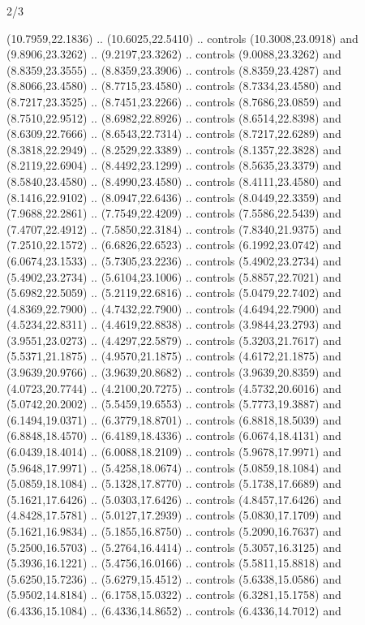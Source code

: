 \begin{flagdescription}{2/3}
\begin{scope}[yshift=\flagwidth,scale=\flagwidth/1241.93737]
\begin{scope}[y=-1mm, x=1mm,draw=gold,fill=blue,line join=miter,miter limit=4,line width=1.8\lw]
{  (10.7959,22.1836) .. (10.6025,22.5410) .. controls (10.3008,23.0918) and
  (9.8906,23.3262) .. (9.2197,23.3262) .. controls (9.0088,23.3262) and
  (8.8359,23.3555) .. (8.8359,23.3906) .. controls (8.8359,23.4287) and
  (8.8066,23.4580) .. (8.7715,23.4580) .. controls (8.7334,23.4580) and
  (8.7217,23.3525) .. (8.7451,23.2266) .. controls (8.7686,23.0859) and
  (8.7510,22.9512) .. (8.6982,22.8926) .. controls (8.6514,22.8398) and
  (8.6309,22.7666) .. (8.6543,22.7314) .. controls (8.7217,22.6289) and
  (8.3818,22.2949) .. (8.2529,22.3389) .. controls (8.1357,22.3828) and
  (8.2119,22.6904) .. (8.4492,23.1299) .. controls (8.5635,23.3379) and
  (8.5840,23.4580) .. (8.4990,23.4580) .. controls (8.4111,23.4580) and
  (8.1416,22.9102) .. (8.0947,22.6436) .. controls (8.0449,22.3359) and
  (7.9688,22.2861) .. (7.7549,22.4209) .. controls (7.5586,22.5439) and
  (7.4707,22.4912) .. (7.5850,22.3184) .. controls (7.8340,21.9375) and
  (7.2510,22.1572) .. (6.6826,22.6523) .. controls (6.1992,23.0742) and
  (6.0674,23.1533) .. (5.7305,23.2236) .. controls (5.4902,23.2734) and
  (5.4902,23.2734) .. (5.6104,23.1006) .. controls (5.8857,22.7021) and
  (5.6982,22.5059) .. (5.2119,22.6816) .. controls (5.0479,22.7402) and
  (4.8369,22.7900) .. (4.7432,22.7900) .. controls (4.6494,22.7900) and
  (4.5234,22.8311) .. (4.4619,22.8838) .. controls (3.9844,23.2793) and
  (3.9551,23.0273) .. (4.4297,22.5879) .. controls (5.3203,21.7617) and
  (5.5371,21.1875) .. (4.9570,21.1875) .. controls (4.6172,21.1875) and
  (3.9639,20.9766) .. (3.9639,20.8682) .. controls (3.9639,20.8359) and
  (4.0723,20.7744) .. (4.2100,20.7275) .. controls (4.5732,20.6016) and
  (5.0742,20.2002) .. (5.5459,19.6553) .. controls (5.7773,19.3887) and
  (6.1494,19.0371) .. (6.3779,18.8701) .. controls (6.8818,18.5039) and
  (6.8848,18.4570) .. (6.4189,18.4336) .. controls (6.0674,18.4131) and
  (6.0439,18.4014) .. (6.0088,18.2109) .. controls (5.9678,17.9971) and
  (5.9648,17.9971) .. (5.4258,18.0674) .. controls (5.0859,18.1084) and
  (5.0859,18.1084) .. (5.1328,17.8770) .. controls (5.1738,17.6689) and
  (5.1621,17.6426) .. (5.0303,17.6426) .. controls (4.8457,17.6426) and
  (4.8428,17.5781) .. (5.0127,17.2939) .. controls (5.0830,17.1709) and
  (5.1621,16.9834) .. (5.1855,16.8750) .. controls (5.2090,16.7637) and
  (5.2500,16.5703) .. (5.2764,16.4414) .. controls (5.3057,16.3125) and
  (5.3936,16.1221) .. (5.4756,16.0166) .. controls (5.5811,15.8818) and
  (5.6250,15.7236) .. (5.6279,15.4512) .. controls (5.6338,15.0586) and
  (5.9502,14.8184) .. (6.1758,15.0322) .. controls (6.3281,15.1758) and
  (6.4336,15.1084) .. (6.4336,14.8652) .. controls (6.4336,14.7012) and
}
\end{scope}
\end{scope}
\end{flagdescription}

